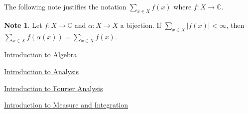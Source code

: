 \documentclass[12pt]{amsart}
\theoremstyle{definition}
\newtheorem{note}[definition]{Note}
\newcommand{\al}{\alpha}
\newcommand{\C}{\mathbb{C}}
\begin{document}
	The following note justifies the notation $\sum_{x \in X}f(x)$ where $f:X \rightarrow \C$.
	
	\begin{note}
		Let $f:X \rightarrow \C$ and $\al:X \rightarrow X$ a bijection. If $\sum_{x \in X}|f(x)|< \infty$, then $\sum_{x \in X}f( \al (x)) = \sum_{x \in X}f(x) $.
	\end{note}
	
	\begin{thebibliography}{4}
	
 \href{https://github.com/carsonaj/Mathematics/blob/master/Introduction\%20to\%20Algebra/Introduction\%20to\%20Algebra.pdf}{Introduction to Algebra}

  \href{https://github.com/carsonaj/Mathematics/blob/master/Introduction\%20to\%20Analysis/Introduction\%20to\%20Analysis.pdf}{Introduction to Analysis}	

  \href{https://github.com/carsonaj/Mathematics/blob/master/Introduction\%20to\%20Fourier\%20Analysis/Introduction\%20to\%20Fourier\%20Analysis.pdf}{Introduction to Fourier Analysis}

  \href{https://github.com/carsonaj/Mathematics/blob/master/Introduction\%20to\%20Measure\%20and\%20Integration/Introduction\%20to\%20Measure\%20and\%20Integration.pdf}{Introduction to Measure and Integration}

\end{thebibliography}
	
\end{document}
